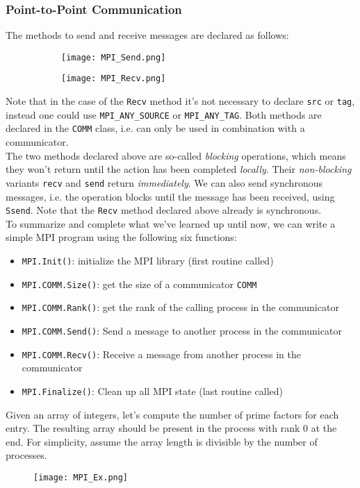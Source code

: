 \documentclass[main]{subfiles}
\begin{document}
\subsubsection{Point-to-Point Communication}
The methods to send and receive messages are declared as follows:
\begin{figure}[H]
    \centering
    \begin{subfigure}{.5\textwidth}
        \centering
        \texttt{[image: MPI\_Send.png]}
    \end{subfigure}%
    \begin{subfigure}{.5\textwidth}
        \centering
        \texttt{[image: MPI\_Recv.png]}
    \end{subfigure}
\end{figure}
Note that in the case of the \texttt{Recv} method it's not necessary to declare \texttt{src} or \texttt{tag}, instead one could use \texttt{MPI\_ANY\_SOURCE} or \texttt{MPI\_ANY\_TAG}. Both methods are declared in the \texttt{COMM} class, i.e. can only be used in combination with a communicator.\\[3mm]
The two methods declared above are so-called \textit{blocking} operations, which means they won't return until the action has been completed \textit{locally}. Their \textit{non-blocking} variants \texttt{recv} and \texttt{send} return \textit{immediately}. We can also send synchronous messages, i.e. the operation blocks until the message has been received, using \texttt{Ssend}. Note that the \texttt{Recv} method declared above already is synchronous.\\[3mm]
To summarize and complete what we've learned up until now, we can write a simple MPI program using the following six functions:
\begin{itemize}
    \item \texttt{MPI.Init()}: initialize the MPI library (first routine called)
    \item \texttt{MPI.COMM.Size()}: get the size of a communicator \texttt{COMM}
    \item \texttt{MPI.COMM.Rank()}: get the rank of the calling process in the communicator
    \item \texttt{MPI.COMM.Send()}: Send a message to another process in the communicator
    \item \texttt{MPI.COMM.Recv()}: Receive a message from another process in the communicator
    \item \texttt{MPI.Finalize()}: Clean up all MPI state (last routine called)
\end{itemize}
\begin{example}
    Given an array of integers, let's compute the number of prime factors for each entry. The resulting array should be present in the process with rank 0 at the end. For simplicity, assume the array length is divisible by the number of processes.
    \begin{figure}[H]
        \centering
        \texttt{[image: MPI\_Ex.png]}
    \end{figure}
\end{example}
\end{document}
